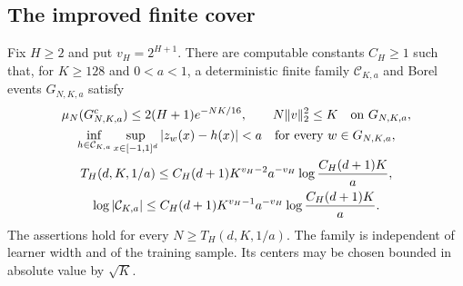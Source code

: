 \subsection{The improved finite cover}

\begin{lemma}
\label{lem:mf-entropy-cover}
Fix $H\geq2$ and put $v_H=2^{H+1}$.  There are computable constants
$C_H\geq1$ such that, for $K\geq128$ and $0<a<1$, a deterministic
finite family $\mathcal C_{K,a}$ and Borel events $G_{N,K,a}$ satisfy
\begin{gather}
 \mu_N(G_{N,K,a}^c)\leq2(H+1)e^{-NK/16},\qquad
 N\|v\|_2^2\leq K\quad\hbox{on }G_{N,K,a},\notag\\
 \inf_{h\in\mathcal C_{K,a}}\sup_{x\in[-1,1]^d}|z_w(x)-h(x)|<a
       \quad\hbox{for every }w\in G_{N,K,a},\notag\\
 T_H(d,K,1/a)
    \leq C_H(d+1)K^{v_H-2}a^{-v_H}
                         \log\frac{C_H(d+1)K}{a},\notag\\
 \log|\mathcal C_{K,a}|
    \leq C_H(d+1)K^{v_H-1}a^{-v_H}
                         \log\frac{C_H(d+1)K}{a}.
 \label{eq:mf-entropy-cover-bounds}
\end{gather}
The assertions hold for every $N\geq T_H(d,K,1/a)$.
The family is independent of learner width and of the training sample.
Its centers may be chosen bounded in absolute value by $\sqrt K$.
\end{lemma}
